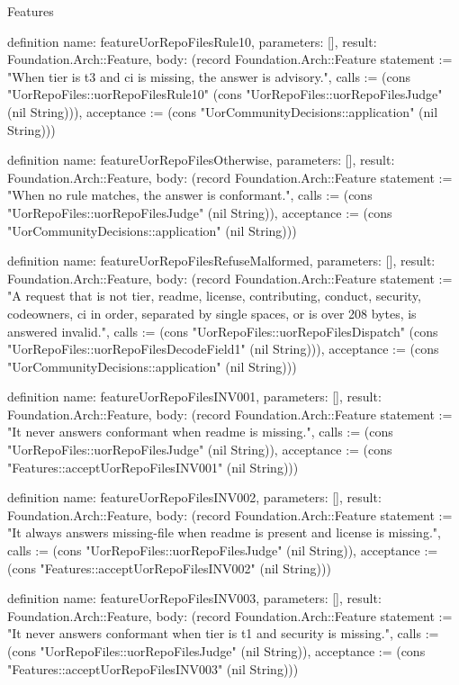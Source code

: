 \begin{lexlean}{Features}
\begin{semanticmodule}
definition{
  name: featureUorRepoFilesRule10,
  parameters: [],
  result: Foundation.Arch::Feature,
  body: (record Foundation.Arch::Feature {statement := "When tier is t3 and ci is missing, the answer is advisory.", calls := (cons "UorRepoFiles::uorRepoFilesRule10" (cons "UorRepoFiles::uorRepoFilesJudge" (nil String))), acceptance := (cons "UorCommunityDecisions::application" (nil String))})
}

definition{
  name: featureUorRepoFilesOtherwise,
  parameters: [],
  result: Foundation.Arch::Feature,
  body: (record Foundation.Arch::Feature {statement := "When no rule matches, the answer is conformant.", calls := (cons "UorRepoFiles::uorRepoFilesJudge" (nil String)), acceptance := (cons "UorCommunityDecisions::application" (nil String))})
}

definition{
  name: featureUorRepoFilesRefuseMalformed,
  parameters: [],
  result: Foundation.Arch::Feature,
  body: (record Foundation.Arch::Feature {statement := "A request that is not tier, readme, license, contributing, conduct, security, codeowners, ci in order, separated by single spaces, or is over 208 bytes, is answered invalid.", calls := (cons "UorRepoFiles::uorRepoFilesDispatch" (cons "UorRepoFiles::uorRepoFilesDecodeField1" (nil String))), acceptance := (cons "UorCommunityDecisions::application" (nil String))})
}

definition{
  name: featureUorRepoFilesINV001,
  parameters: [],
  result: Foundation.Arch::Feature,
  body: (record Foundation.Arch::Feature {statement := "It never answers conformant when readme is missing.", calls := (cons "UorRepoFiles::uorRepoFilesJudge" (nil String)), acceptance := (cons "Features::acceptUorRepoFilesINV001" (nil String))})
}

definition{
  name: featureUorRepoFilesINV002,
  parameters: [],
  result: Foundation.Arch::Feature,
  body: (record Foundation.Arch::Feature {statement := "It always answers missing-file when readme is present and license is missing.", calls := (cons "UorRepoFiles::uorRepoFilesJudge" (nil String)), acceptance := (cons "Features::acceptUorRepoFilesINV002" (nil String))})
}

definition{
  name: featureUorRepoFilesINV003,
  parameters: [],
  result: Foundation.Arch::Feature,
  body: (record Foundation.Arch::Feature {statement := "It never answers conformant when tier is t1 and security is missing.", calls := (cons "UorRepoFiles::uorRepoFilesJudge" (nil String)), acceptance := (cons "Features::acceptUorRepoFilesINV003" (nil String))})
}


\end{semanticmodule}
\end{lexlean}
